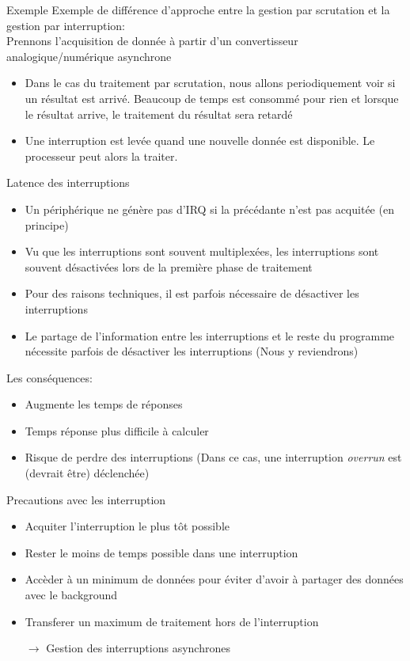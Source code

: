 \begin{frame}{Exemple}
  Exemple de différence d'approche entre la gestion par scrutation et
  la gestion par interruption:\\

  Prennons  l'acquisition  de   donnée  à  partir  d'un  convertisseur
  analogique/numérique asynchrone
  \begin{itemize}
  \item  Dans  le  cas  du  traitement  par  scrutation,  nous  allons
    periodiquement voir  si un résultat est arrivé.  Beaucoup de temps
    est  consommé  pour  rien   et  lorsque  le  résultat  arrive,  le
    traitement du résultat sera retardé
  \item  Une interruption  est  levée quand  une  nouvelle donnée  est
    disponible. Le processeur peut alors la traiter.
  \end{itemize}
\end{frame}

\begin{frame}{Latence des interruptions}
  \begin{itemize}
  \item Un périphérique ne génère pas d'IRQ si la précédante n'est pas
    acquitée (en principe)
  \item Vu  que les  interruptions sont souvent  multiplexées, les
    interruptions sont  souvent désactivées lors de  la première phase
    de traitement
  \item  Pour des  raisons techniques,  il est  parfois  nécessaire de
    désactiver les interruptions
  \item  Le partage  de l'information  entre les  interruptions  et le
    reste   du   programme  nécessite   parfois   de  désactiver   les
    interruptions (Nous y reviendrons)
  \end{itemize}
  Les conséquences:
  \begin{itemize}
  \item Augmente les temps de réponses
  \item Temps réponse plus difficile à calculer
  \item  Risque   de  perdre  des  interruptions  (Dans   ce  cas,  une
    interruption \emph{overrun} est (devrait être) déclenchée)
  \end{itemize}
\end{frame}

\begin{frame}{Precautions avec les interruption}
  \begin{itemize}
  \item Acquiter l'interruption le plus tôt possible
  \item Rester le moins de temps possible dans une interruption
  \item Accèder à un minimum de données pour éviter d'avoir à partager
    des données avec le background
  \item Transferer un maximum de traitement hors de l'interruption
  \item[$\rightarrow$] Gestion des interruptions asynchrones
  \end{itemize}
\end{frame}

